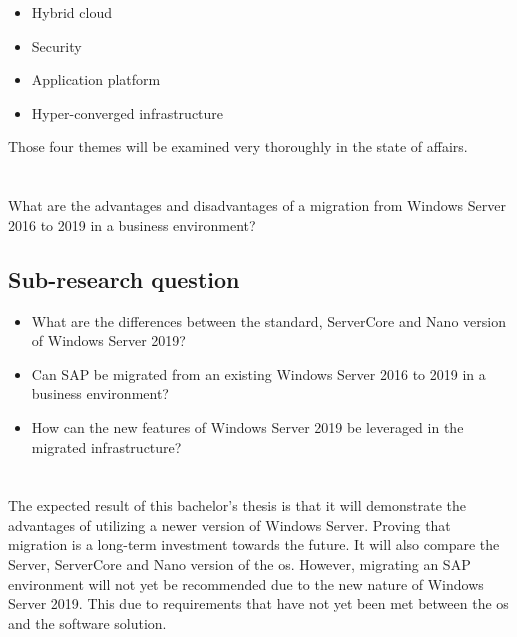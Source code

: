\begin{itemize}
	\item Hybrid cloud
	\item Security
	\item Application platform
	\item Hyper-converged infrastructure
\end{itemize}

Those four themes will be examined very thoroughly in the state of affairs.

\section{}
\label{sec:onderzoeksvraag}
What are the advantages and disadvantages of a migration from Windows Server 2016 to 2019 in a business environment?

\subsection{Sub-research question}

\begin{itemize}
	\item What are the differences between the standard, ServerCore and Nano version of Windows Server 2019?
	\item Can SAP be migrated from an existing Windows Server 2016 to 2019 in a business environment?
	\item How can the new features of Windows Server 2019 be leveraged in the migrated infrastructure? 
\end{itemize}

\section{}
\label{sec:onderzoeksdoelstelling}

The expected result of this bachelor's thesis is that it will demonstrate the advantages of utilizing a newer version of Windows Server. Proving that migration is a long-term investment towards the future. It will also compare the Server, ServerCore and Nano version of the \acrshort{os}. However, migrating an SAP environment will not yet be recommended due to the new nature of Windows Server 2019. This due to requirements that have not yet been met between the \acrshort{os} and the software solution. 

